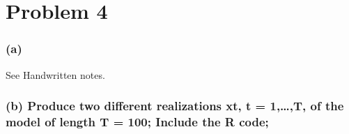 \documentclass[
]{article}
\begin{document}
\hypertarget{problem-4}{%
\section{Problem 4}\label{problem-4}}

\hypertarget{a}{%
\subsubsection{(a)}\label{a}}

See Handwritten notes.

\hypertarget{b-produce-two-different-realizations-xt-t-1t-of-the-model-of-length-t-100-include-the-r-code}{%
\subsubsection{(b) Produce two different realizations xt, t =
1,\ldots,T, of the model of length T = 100; Include the R
code;}\label{b-produce-two-different-realizations-xt-t-1t-of-the-model-of-length-t-100-include-the-r-code}}
\end{document}
